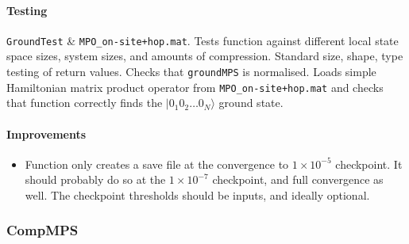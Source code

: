  \paragraph{Testing}
 \lstinline$GroundTest$ \& \lstinline$MPO_on-site+hop.mat$. Tests function against different local state space sizes, system sizes, and amounts of compression. Standard size, shape, type testing of return values. Checks that \lstinline$groundMPS$ is normalised. Loads simple Hamiltonian matrix product operator from \lstinline$MPO_on-site+hop.mat$ and checks that function correctly finds the \(|0_{1}0_{2}\ldots 0_{N} \rangle\) ground state.
 \paragraph{Improvements}
 \begin{itemize}
 \item Function only creates a save file at the convergence to \(1 \times 10^{-5}\) checkpoint. It should probably do so at the \(1 \times 10^{-7}\) checkpoint, and full convergence as well. The checkpoint thresholds should be inputs, and ideally optional.
 \end{itemize}
 
 \subsubsection{CompMPS} 
